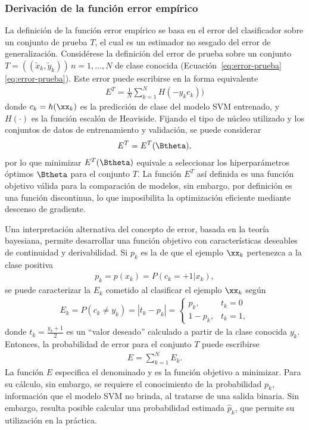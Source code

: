 %
\subsubsection{Derivación de la función error empírico}
%
La definición de la función error empírico se basa en el error del
clasificador sobre un conjunto de prueba $T$, el cual es un estimador
no sesgado del error de generalización. Considérese la definición del
error de prueba sobre un conjunto
$T=((\tilde{x}_k,\tilde{y}_k))\,n=1,\ldots,N$ de clase conocida
(\iflatexml{}Ecuación~\ref{eq:error-prueba}\else\autoref{eq:error-prueba}\fi).
Este error puede escribirse en la forma equivalente
%
\begin{align}
\label{e3:error-test-alt}
  E^T = \frac{1}{N}\sum_{k=1}^{N} H(-{y}_k {c}_k))
\end{align}
%
donde $c_k=h(\xx_k)$ es la predicción de clase del modelo SVM
entrenado, y $H(\cdot)$ es la función escalón de Heaviside. Fijando el
tipo de núcleo utilizado y los conjuntos de datos de entrenamiento y
validación, se puede considerar
%
\begin{align}
\label{e3:error-test-func-theta}  
  E^T = E^T(\Btheta),
\end{align}
%
por lo que minimizar $E^T(\Btheta)$ equivale a seleccionar los
hiperparámetros óptimos $\Btheta$ para el conjunto $T$.  La función
$E^T$ así definida es una función objetivo válida para la comparación
de modelos, sin embargo, por definición es una función discontinua, lo
que imposibilita la optimización eficiente mediante descenso de
gradiente.

Una interpretación alternativa del concepto de error, basada en la
teoría bayesiana, permite desarrollar una función objetivo con
características deseables de continuidad y derivabilidad.  Si $p_k$ es
la  de que el ejemplo $\xx_k$ pertenezca
a la clase positiva
%
\begin{align}
  \label{e3:pk}
  p_k = p(x_k) = P(c_k=+1|x_k), %
\end{align}
%
se puede caracterizar la  $E_k$ cometido al
clasificar el ejemplo $\xx_k$ según
%
\begin{align}
\label{e3:Ek}
  E_k = P(c_k\neq y_k) = |t_k-{p}_k| =
  \begin{cases}
    {p}_k, & t_k=0\\ 1-{p}_k, & t_k = 1,
  \end{cases}
\end{align}
%
donde $t_k=\frac{y_k+1}{2}$ es un ``valor deseado'' calculado a partir
de la clase conocida $y_k$.  Entonces, la probabilidad de error para
el conjunto $T$ puede escribirse
%
\begin{align}
\label{Err1}
  E = \sum_{k=1}^{N} E_k.
\end{align}
%
La función $E$ especifica el denominado  y es la
función objetivo a minimizar. Para su cálculo, sin embargo, se
requiere el conocimiento de la probabilidad $p_k$, información que el
modelo SVM no brinda, al tratarse de una salida binaria. Sin embargo,
resulta posible calcular una probabilidad estimada $\hat{p}_k$, que
permite su utilización en la práctica.
